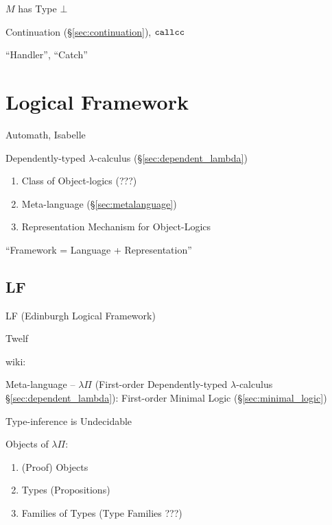 $M$ has Type $\bot$

Continuation (\S\ref{sec:continuation}), $\mathtt{callcc}$

``Handler'', ``Catch'' %



\section{Logical Framework}\label{sec:logical_framework}


Automath, Isabelle

Dependently-typed $\lambda$-calculus (\S\ref{sec:dependent_lambda})

\begin{enumerate}
  \item Class of Object-logics (???)
  \item Meta-language (\S\ref{sec:metalanguage})
  \item Representation Mechanism for Object-Logics
\end{enumerate}

``Framework = Language + Representation''



\subsection{LF}\label{sec:lf}

LF (Edinburgh Logical Framework)

Twelf


wiki:

Meta-language -- $\lambda\Pi$ (First-order Dependently-typed
$\lambda$-calculus \S\ref{sec:dependent_lambda}): First-order Minimal
Logic (\S\ref{sec:minimal_logic})

\fist Type-inference is Undecidable %

Objects of $\lambda\Pi$:
\begin{enumerate}
  \item (Proof) Objects
  \item Types (Propositions)
  \item Families of Types (Type Families ???)
\end{enumerate}

